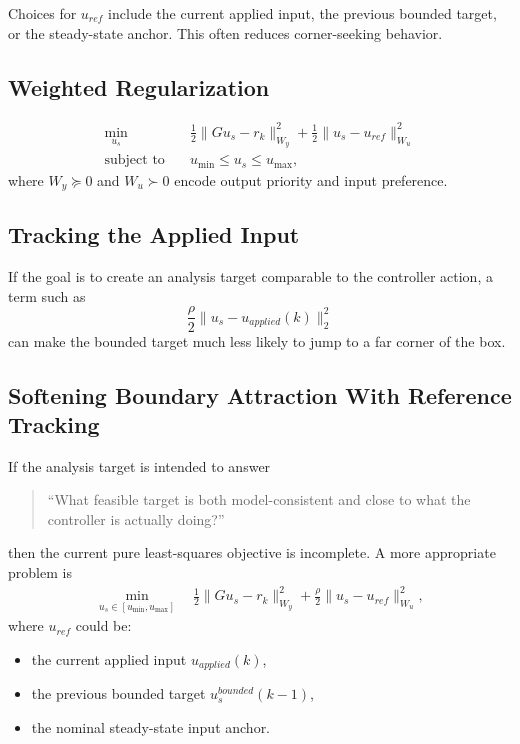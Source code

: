 \documentclass[11pt]{article}
\begin{document}
Choices for $u_{ref}$ include the current applied input, the previous bounded target, or the steady-state anchor. This often reduces corner-seeking behavior.

\subsection{Weighted Regularization}

\begin{align}
\min_{u_s} \quad &
\frac{1}{2}\|Gu_s-r_k\|_{W_y}^2
+
\frac{1}{2}\|u_s-u_{ref}\|_{W_u}^2 \\
\text{subject to} \quad & u_{\min} \le u_s \le u_{\max},
\end{align}
where $W_y \succeq 0$ and $W_u \succ 0$ encode output priority and input preference.

\subsection{Tracking the Applied Input}

If the goal is to create an analysis target comparable to the controller action, a term such as
\[
\frac{\rho}{2}\|u_s-u_{applied}(k)\|_2^2
\]
can make the bounded target much less likely to jump to a far corner of the box.

\subsection{Softening Boundary Attraction With Reference Tracking}

If the analysis target is intended to answer
\begin{quote}
``What feasible target is both model-consistent and close to what the controller is actually doing?''
\end{quote}
then the current pure least-squares objective is incomplete. A more appropriate problem is
\begin{align}
\min_{u_s \in [u_{\min},u_{\max}]} \quad
\frac{1}{2}\|Gu_s-r_k\|_{W_y}^2
+
\frac{\rho}{2}\|u_s-u_{ref}\|_{W_u}^2,
\end{align}
where $u_{ref}$ could be:
\begin{itemize}
\item the current applied input $u_{applied}(k)$,
\item the previous bounded target $u_s^{bounded}(k-1)$,
\item the nominal steady-state input anchor.
\end{itemize}
\end{document}
